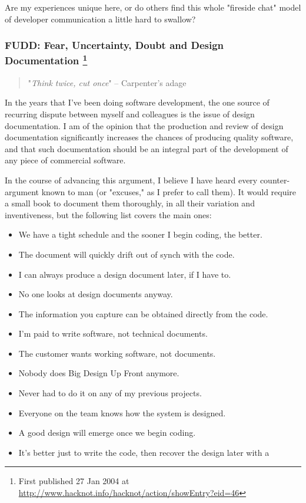 \documentclass{article}
\begin{document}
Are my experiences unique here, or do others find this whole "fireside
chat" model of developer communication a little hard to swallow?

\subsubsection{FUDD: Fear, Uncertainty, Doubt and Design Documentation \footnote{First published 27 Jan 2004 at
\url{http://www.hacknot.info/hacknot/action/showEntry?eid=46}}}
\label{sec:orgheadline255}

\begin{quote}
"\emph{Think twice, cut once}" -- Carpenter's adage
\end{quote}

In the years that I've been doing software development, the one source
of recurring dispute between myself and colleagues is the issue of
design documentation. I am of the opinion that the production and review
of design documentation significantly increases the chances of producing
quality software, and that such documentation should be an integral part
of the development of any piece of commercial software.

In the course of advancing this argument, I believe I have heard every
counter-argument known to man (or "excuses," as I prefer to call them).
It would require a small book to document them thoroughly, in all their
variation and inventiveness, but the following list covers the main
ones:

\begin{itemize}
\item We have a tight schedule and the sooner I begin coding, the better.
\item The document will quickly drift out of synch with the code.
\item I can always produce a design document later, if I have to.
\item No one looks at design documents anyway.
\item The information you capture can be obtained directly from the code.
\item I'm paid to write software, not technical documents.
\item The customer wants working software, not documents.
\item Nobody does Big Design Up Front anymore.
\item Never had to do it on any of my previous projects.
\item Everyone on the team knows how the system is designed.
\item A good design will emerge once we begin coding.
\item It's better just to write the code, then recover the design later
with a
\end{itemize}
\end{document}
